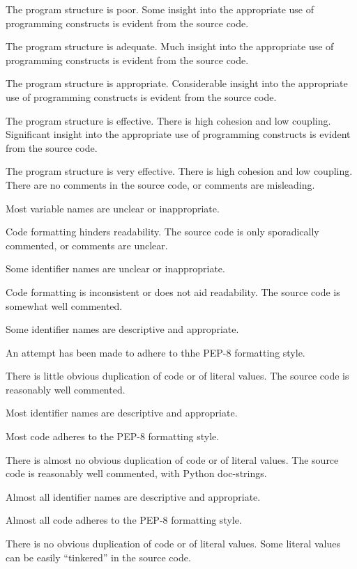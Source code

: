 \documentclass{../../fal_assignment}
\begin{document}
\begin{markingrubric}
	\par The program structure is poor.
	\grade Some insight into the appropriate use of programming constructs is evident from the source code.
	\par The program structure is adequate.
	\grade Much insight into the appropriate use of programming constructs is evident from the source code.
	\par The program structure is appropriate.
	\grade Considerable insight into the appropriate use of programming constructs is evident from the source code.
	\par The program structure is effective. There is high cohesion and low coupling.
	\grade Significant insight into the appropriate use of programming constructs is evident from the source code.
	\par The program structure is very effective. There is high cohesion and low coupling.
	\grade\fail There are no comments in the source code, or comments are misleading.
	\par Most variable names are unclear or inappropriate.
	\par Code formatting hinders readability.
	\grade The source code is only sporadically commented, or comments are unclear.
	\par Some identifier names are unclear or inappropriate.
	\par Code formatting is inconsistent or does not aid readability.
	\grade The source code is somewhat well commented.
	\par Some identifier names are descriptive and appropriate.
	\par An attempt has been made to adhere to thhe PEP-8 formatting style.
	\par There is little obvious duplication of code or of literal values.           
	\grade The source code is reasonably well commented.
	\par Most identifier names are descriptive and appropriate.
	\par Most code adheres to the PEP-8 formatting style.
	\par There is almost no obvious duplication of code or of literal values.   
	\grade The source code is reasonably well commented, with Python doc-strings.
	\par Almost all identifier names are descriptive and appropriate.
	\par Almost all code adheres to the PEP-8 formatting style.
	\par There is no obvious duplication of code or of literal values. Some literal values can be easily ``tinkered'' in the source code. 

\end{markingrubric}
\end{document}
